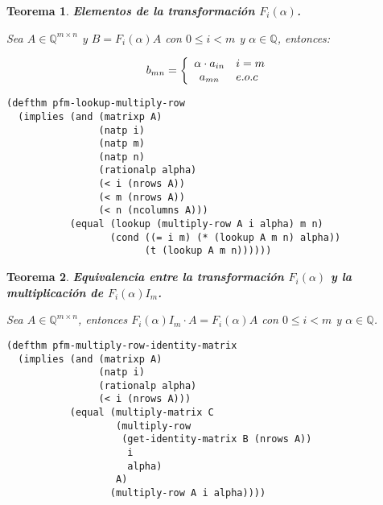 \documentclass[a4paper,10pt]{article}
\newcommand{\Q}[1]{#1 \in \mathbb{Q}}
\newcommand{\M}[3]{#1 \in \mathbb{Q}^{#2 \times #3}}
\newtheorem{teor}{{Teorema}}
\begin{document}
\par \vspace{16pt}

\begin{teor} \textbf{Elementos de la transformación $F_{i}(\alpha)$.}\vspace{8pt}\par
Sea $\M{A}{m}{n}$ y $B = F_{i}(\alpha)A$ con $0 \leq i < m$ y $\Q{\alpha}$, entonces:

\begin{equation*} 
b_{mn} = \left\{\begin{array}{c l} \alpha \cdot a_{in} & i = m\\ 
                                   a_{mn} & e.o.c\end{array}\right.
\end{equation*}

\end{teor}

\begin{lstlisting}[language=clips]
(defthm pfm-lookup-multiply-row
  (implies (and (matrixp A)
                (natp i)
                (natp m)
                (natp n)
                (rationalp alpha)
                (< i (nrows A))
                (< m (nrows A))
                (< n (ncolumns A)))
           (equal (lookup (multiply-row A i alpha) m n)
                  (cond ((= i m) (* (lookup A m n) alpha))
                        (t (lookup A m n))))))
\end{lstlisting}

\par \vspace{16pt}

\begin{teor} \textbf{Equivalencia entre la transformación $F_{i}(\alpha)$ y la multiplicación de $F_{i}(\alpha)I_m$.}\vspace{8pt}\par
Sea $\M{A}{m}{n}$, entonces $F_{i}(\alpha)I_m \cdot A = F_{i}(\alpha)A$ con $0 \leq i < m$ y $\Q{\alpha}$.
\end{teor}

\begin{lstlisting}[language=clips]
(defthm pfm-multiply-row-identity-matrix
  (implies (and (matrixp A)
                (natp i)
                (rationalp alpha)
                (< i (nrows A)))
           (equal (multiply-matrix C
                   (multiply-row 
                    (get-identity-matrix B (nrows A)) 
                     i 
                     alpha) 
                   A)
                  (multiply-row A i alpha))))
\end{lstlisting}
\end{document}
